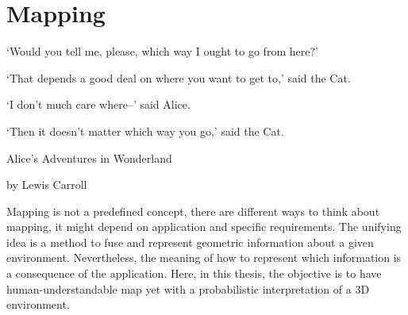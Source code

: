 
\chapter{Mapping}

\renewcommand{\epigraphsize}{\footnotesize}
\epigraph{`Would you tell me, please, which way I ought to go from here?'

  `That depends a good deal on where you want to get to,' said the Cat.

  `I don't much care where--' said Alice.

  `Then it doesn't matter which way you go,' said the Cat. }{Alice's Adventures
  in Wonderland

  by Lewis Carroll}
  
Mapping is not a predefined concept, there are different ways to think about
mapping, it might depend on application and specific requirements. The unifying
idea is a method to fuse and represent geometric information about a given environment. Nevertheless, the
meaning of how to represent which information is a consequence of the
application. Here, in this thesis, the objective is to have human-understandable
map yet with a probabilistic interpretation of a 3D environment. 








